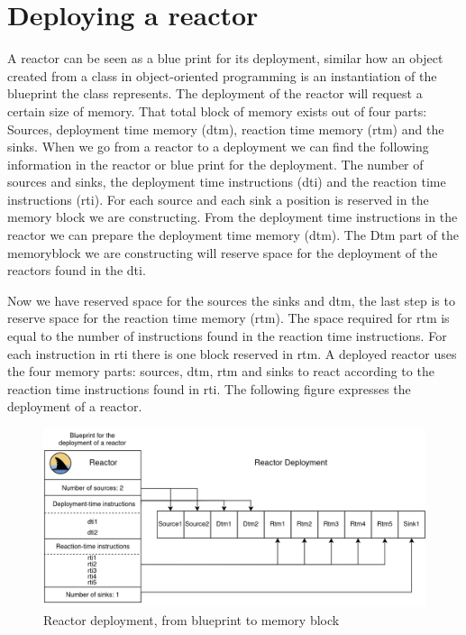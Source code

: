 \documentclass[a4paper]{book}
\begin{document}
\section{Deploying a reactor}
A reactor can be seen as a blue print for its deployment, similar how an object created from a class in object-oriented programming is an instantiation of the blueprint the class represents. The deployment of the reactor will request a certain size of memory. That total block of memory exists out of four parts: Sources, deployment time memory (dtm), reaction time memory (rtm) and the sinks. When we go from a reactor to a deployment we can find the following information in the reactor or blue print for the deployment. The number of sources and sinks, the deployment time instructions (dti) and the reaction time instructions (rti). For each source and each sink a position is reserved in the memory block we are constructing. From the deployment time instructions in the reactor we can prepare the deployment time memory (dtm). The Dtm part of the memoryblock we are constructing will reserve space for the deployment of the reactors found in the dti. 

Now we have reserved space for the sources the sinks and dtm, the last step is to reserve space for the reaction time memory (rtm). The space required for rtm is equal to the number of instructions found in the reaction time instructions. For each instruction in rti there is one block reserved in rtm. A deployed reactor uses the four memory parts: sources, dtm, rtm and sinks to react according to the reaction time instructions found in rti. The following figure expresses the deployment of a reactor.
     
\begin{figure}[h]
	\caption{Reactor deployment, from blueprint to memory block}
	\includegraphics[width=\textwidth]{rd.drawio}
\end{figure} 
\end{document}
